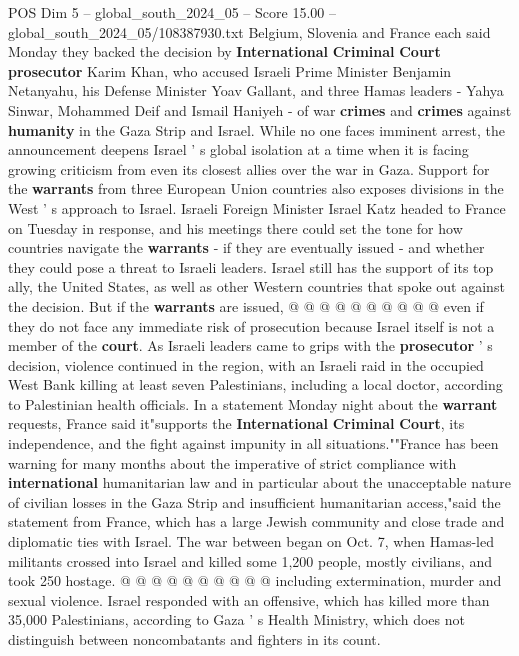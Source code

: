 \begin{textsample}{POS Dim 5 – global\_south\_2024\_05 – Score 15.00 – global\_south\_2024\_05/108387930.txt}  \label{ex:f5_pos_126}
Belgium, Slovenia and France each said Monday they backed the decision by \textbf{International} \textbf{Criminal} \textbf{Court} \textbf{prosecutor} Karim Khan, who accused Israeli Prime Minister Benjamin Netanyahu, his Defense Minister Yoav Gallant, and three Hamas leaders - Yahya Sinwar, Mohammed Deif and Ismail Haniyeh - of war \textbf{crimes} and \textbf{crimes} against \textbf{humanity} in the Gaza Strip and Israel.
While no one faces imminent arrest, the announcement deepens Israel ' s global isolation at a time when it is facing growing criticism from even its closest allies over the war in Gaza.
Support for the \textbf{warrants} from three European Union countries also exposes divisions in the West ' s approach to Israel.
Israeli Foreign Minister Israel Katz headed to France on Tuesday in response, and his meetings there could set the tone for how countries navigate the \textbf{warrants} - if they are eventually issued - and whether they could pose a threat to Israeli leaders.
Israel still has the support of its top ally, the United States, as well as other Western countries that spoke out against the decision.
But if the \textbf{warrants} are issued, @ @ @ @ @ @ @ @ @ @ even if they do not face any immediate risk of prosecution because Israel itself is not a member of the \textbf{court}.
As Israeli leaders came to grips with the \textbf{prosecutor} ' s decision, violence continued in the region, with an Israeli raid in the occupied West Bank killing at least seven Palestinians, including a local doctor, according to Palestinian health officials.
In a statement Monday night about the \textbf{warrant} requests, France said it"supports the \textbf{International} \textbf{Criminal} \textbf{Court}, its independence, and the fight against impunity in all situations.""France has been warning for many months about the imperative of strict compliance with \textbf{international} humanitarian law and in particular about the unacceptable nature of civilian losses in the Gaza Strip and insufficient humanitarian access,"said the statement from France, which has a large Jewish community and close trade and diplomatic ties with Israel.
The war between began on Oct. 7, when Hamas-led militants crossed into Israel and killed some 1,200 people, mostly civilians, and took 250 hostage. @ @ @ @ @ @ @ @ @ @ including extermination, murder and sexual violence.
Israel responded with an offensive, which has killed more than 35,000 Palestinians, according to Gaza ' s Health Ministry, which does not distinguish between noncombatants and fighters in its count.

\end{textsample}
